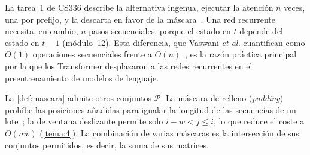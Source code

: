 La tarea~1 de CS336 describe la alternativa ingenua, ejecutar la atención $n$ veces, una por prefijo, y la descarta en favor de la máscara~\cite[§3.4.5]{cs336}. Una red recurrente necesita, en cambio, $n$ pasos secuenciales, porque el estado en $t$ depende del estado en $t-1$ (módulo~12). Esta diferencia, que Vaswani \emph{et al.} cuantifican como $O(1)$ operaciones secuenciales frente a $O(n)$~\cite[§4, tabla~1]{vaswani}, es la razón práctica principal por la que los Transformer desplazaron a las redes recurrentes en el preentrenamiento de modelos de lenguaje.

\begin{observacion}
La \cref{def:mascara} admite otros conjuntos $\mathcal{P}$. La máscara de relleno (\emph{padding}) prohíbe las posiciones añadidas para igualar la longitud de las secuencias de un lote~\cite[§11.3.2.1]{d2l}; la de ventana deslizante permite solo $i-w<j\le i$, lo que reduce el coste a $O(nw)$ (\cref{tema:4}). La combinación de varias máscaras es la intersección de sus conjuntos permitidos, es decir, la suma de sus matrices.
\end{observacion}

